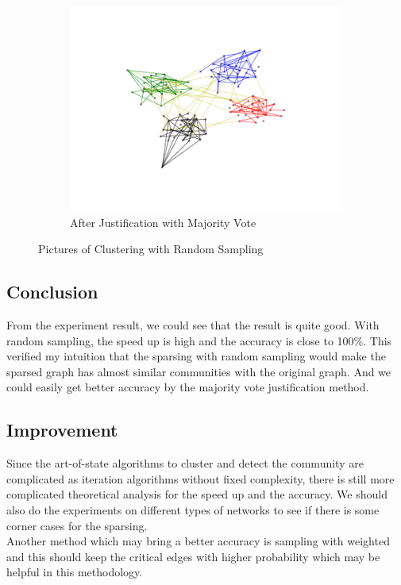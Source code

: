 \begin{figure}[h!]
        \begin{subfigure}[h]{0.5\textwidth}
                \includegraphics[width=\textwidth]{fig/223.png}
                \caption{After Justification with Majority Vote}
                \label{fig:vote}
        \end{subfigure}
        \caption{Pictures of Clustering with Random Sampling}\label{fig:cluster}
\end{figure}

\subsection{Conclusion}
From the experiment result, we could see that the result is quite good. With random sampling, the speed up is high and the accuracy is close to 100\%. This verified my intuition that the sparsing with random sampling would make the sparsed graph has almost similar communities with the original graph. And we could easily get better accuracy by the majority vote justification method.

\subsection{Improvement}
Since the art-of-state algorithms to cluster and detect the community are complicated as iteration algorithms without fixed complexity, there is still more complicated theoretical analysis for the speed up and the accuracy. We should also do the experiments on different types of networks to see if there is some corner cases for the sparsing. \\
Another method which may bring a better accuracy is sampling with weighted and this should keep the critical edges with higher probability which may be helpful in this methodology.


